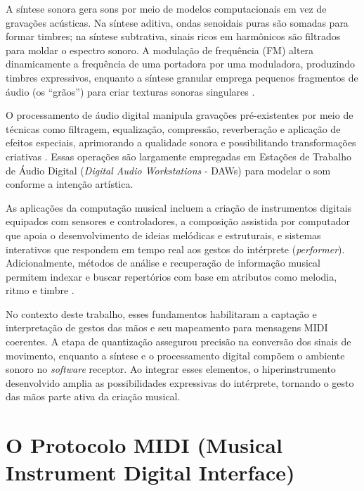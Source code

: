 A síntese sonora gera sons por meio de modelos computacionais em vez de gravações acústicas. Na síntese aditiva, ondas senoidais puras são somadas para formar timbres; na síntese subtrativa, sinais ricos em harmônicos são filtrados para moldar o espectro sonoro. A modulação de frequência (FM) altera dinamicamente a frequência de uma portadora por uma moduladora, produzindo timbres expressivos, enquanto a síntese granular emprega pequenos fragmentos de áudio (os ``grãos'') para criar texturas sonoras singulares \cite{Manning1993}.

O processamento de áudio digital manipula gravações pré-existentes por meio de técnicas como filtragem, equalização, compressão, reverberação e aplicação de efeitos especiais, aprimorando a qualidade sonora e possibilitando transformações criativas \cite{Zolzer2011}. Essas operações são largamente empregadas em Estações de Trabalho de Áudio Digital (\textit{Digital Audio Workstations} - DAWs) para modelar o som conforme a intenção artística.

As aplicações da computação musical incluem a criação de instrumentos digitais equipados com sensores e controladores, a composição assistida por computador que apoia o desenvolvimento de ideias melódicas e estruturais, e sistemas interativos que respondem em tempo real aos gestos do intérprete (\textit{performer}). Adicionalmente, métodos de análise e recuperação de informação musical permitem indexar e buscar repertórios com base em atributos como melodia, ritmo e timbre \cite{Cope2001}.

No contexto deste trabalho, esses fundamentos habilitaram a captação e interpretação de gestos das mãos e seu mapeamento para mensagens MIDI coerentes. A etapa de quantização assegurou precisão na conversão dos sinais de movimento, enquanto a síntese e o processamento digital compõem o ambiente sonoro no \textit{software} receptor. Ao integrar esses elementos, o hiperinstrumento desenvolvido amplia as possibilidades expressivas do intérprete, tornando o gesto das mãos parte ativa da criação musical.

\section{O Protocolo MIDI (Musical Instrument Digital Interface)}
\label{sec:protocolo_midi}

